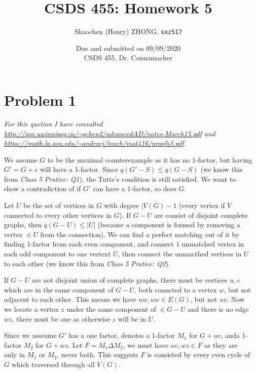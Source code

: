 \documentclass[11pt]{article}
\newcommand{\ilc}{\texttt}
\begin{document}
\title{\textbf{CSDS 455: Homework 5}}

\author{Shaochen (Henry) ZHONG, \ilc{sxz517}}
\date{Due and submitted on 09/09/2020 \\ CSDS 455, Dr. Connamacher}
\maketitle

\section{Problem 1}

\textit{For this quetion I have consulted \url{http://ion.uwinnipeg.ca/~ychen2/advancedAD/notes-March15.pdf} and \url{https://math.la.asu.edu/~andrzej/teach/mat416/proofs3.pdf}.}\newline


We assume $G$ to be the maximal counterexample as it has no 1-factor, but having $G' = G+e$ will have a 1-factor. Since $q(G'-S) \leq q(G-S)$ (we know this from \textit{Class 5 Pratice: Q1}), the Tutte's condition is still satisfied. We want to show a contradiction of if $G'$ can have a 1-factor, so does $G$.\newline

Let $U$ be the set of vertices in $G$ with degree $|V(G)-1$ (every vertex if $V$ connected to every other vertices in $G$). If $G-U$ are consist of disjoint complete graphs, then $q(G-U) \leq |U|$ (because a component is formed by removing a vertex $\in U$ from the connection). We can find a perfect matching out of it by finding 1-factor from each even component, and connect $1$ unmatched vertex in each odd component to one vertext $U$, then connect the unmacthed vertices in $U$ to each other (we know this from \textit{Class 5 Pratice: Q2}).\newline

If $G-U$ are not disjoint union of complete graphs, there must be vertices $u, v$ which are in the same component of $G-U$, both conncted to a vertex $w$, but not adjacent to each other. This means we have $uw, uw \in E(G)$, but not $uv$. Now we locate a vertex $z$ under the same component of $\in G-U$ and there is no edge $wz$, there must be one as otherwise $z$ will be in $U$.

Since we asssume $G'$ has a one factor, denotes a 1-factor $M_1$ for $G+uv$, anda 1-factor $M_2$ for $G+wz$. Let $F = M_1 \Delta M_2$, we must have $uv, wz \in F$ as they are only in $M_1$ or $M_2$, never both. This suggests $F$ is consisted by every even cycle of $G$ which traversed through all $V(G)$.\newline
\end{document}
